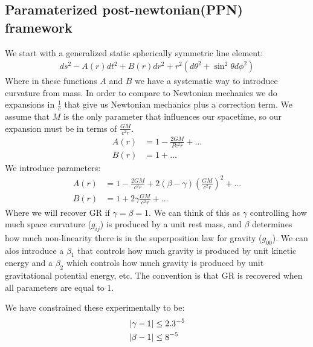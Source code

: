 \subsection{Paramaterized post-newtonian(PPN) framework}
We start with a generalized static spherically symmetric line element:
\begin{align*}
	ds^2 -A(r)dt^2 + B(r) dr^2 + r^2(d\theta^2 + \sin^2\theta d\phi^2)
\end{align*}
Where in these functions $A$ and $B$ we have a systematic way to introduce curvature from mass. In order to compare to Newtonian mechanics we do expansions in $\frac{1}{c}$ that give us Newtonian mechanics plus a correction term.
We assume that $M$ is the only parameter that influences our spacetime, so our expansion must be in terms of $\frac{GM}{c^2 r}$.
\begin{align*}
	A(r) &= 1 - \frac{2GM}{Pc^2 r} + \ldots \\
	B(r) &= 1 + \ldots
\end{align*}
We introduce parameters:
\begin{align*}
	A(r) &= 1 - \frac{2GM}{c^2 r} + 2(\beta - \gamma)\left(\frac{GM}{c^2 r}\right)^2  + \ldots \\
	B(r) &= 1 + 2\gamma \frac{GM}{c^2 r} + \ldots
\end{align*}
Where we will recover GR if $\gamma = \beta = 1$. We can think of this as $\gamma$ controlling how much space curvature ($g_{ij}$) is produced by a unit rest mass, and $\beta$ determines how much non-linearity there is in the superposition law for gravity ($g_{00}$).
We can alos introduce a $\beta_1$ that controls how much gravity is produced by unit kinetic energy and a $\beta_2$ which controls how much gravity is produced by unit gravitational potential energy, etc.
The convention is that GR is recovered when all parameters are equal to $1$.

We have constrained these experimentally to be:
\begin{align*}
	|\gamma-1| &\leq 2.3\time 10^{-5} \\
	|\beta - 1| &\leq 8\time 10^{-5}
\end{align*}
